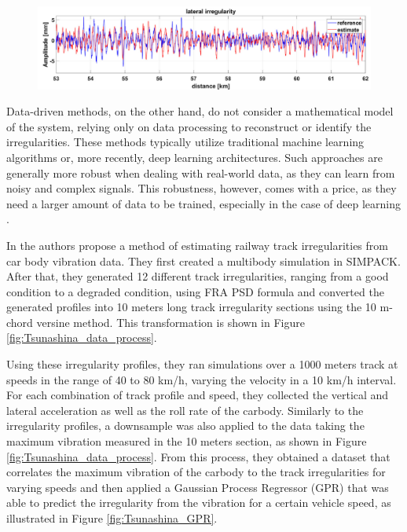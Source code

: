 \begin{figure}[H]
    \centering
    \includegraphics[width=12cm]{Cap2_LitReview/Track_Quality_Accel/DeRosa_Result_Real.png}
    \caption{\cite{DEROSA2019606}}
    \label{fig:DeRosa_Results}
\end{figure}

Data-driven methods, on the other hand, do not consider a mathematical model of the system, relying only on data processing to reconstruct or identify the irregularities. These methods typically utilize traditional machine learning algorithms or, more recently, deep learning architectures. Such approaches are generally more robust when dealing with real-world data, as they can learn from noisy and complex signals. This robustness, however, comes with a price, as they need a larger amount of data to be trained, especially in the case of deep learning \cite{Sansinena26032025}. 

In \cite{vibration7040049} the authors propose a method of estimating railway track irregularities from car body vibration data. They first created a multibody simulation in SIMPACK. After that, they generated 12 different track irregularities, ranging from a good condition to a degraded condition, using FRA PSD formula and converted the generated profiles into 10 meters long track irregularity sections using the 10 m-chord versine method. This transformation is shown in Figure \ref{fig:Tsunashina_data_process}.

Using these irregularity profiles, they ran simulations over a 1000 meters track at speeds in the range of 40 to 80 km/h, varying the velocity in a 10 km/h interval. For each combination of track profile and speed, they collected the vertical and lateral acceleration as well as the roll rate of the carbody. Similarly to the irregularity profiles, a downsample was also applied to the data taking the maximum vibration measured in the 10 meters section, as shown in Figure \ref{fig:Tsunashina_data_process}. From this process, they obtained a dataset that correlates the maximum vibration of the carbody to the track irregularities for varying speeds and then applied a Gaussian Process Regressor (GPR) that was able to predict the irregularity from the vibration for a certain vehicle speed, as illustrated in Figure \ref{fig:Tsunashina_GPR}. 


